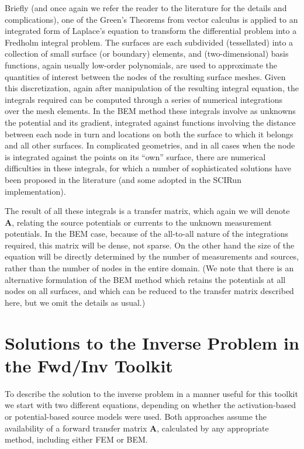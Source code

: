 Briefly (and once again we refer the reader to the literature for the
details and complications), one of the Green's Theorems from vector
calculus is applied to an integrated form of Laplace's equation to transform the
differential problem into a Fredholm integral problem.  The surfaces are
each subdivided (tessellated) into a collection of small surface (or
boundary) elements, and (two-dimensional) basis functions, again usually
low-order polynomials, are used to
approximate the quantities of interest between the nodes of the resulting
surface meshes. Given this discretization, again after
manipulation of the resulting integral equation,
the integrals required can
be computed through a series of numerical integrations over the mesh
elements. In the BEM method these integrals involve as unknowns the
potential and its gradient, integrated against functions involving the
distance between each node in turn and locations on both the surface to
which it belongs and all other surfaces. In complicated geometries, and in
all cases when the node is integrated against the points on its ``own''
surface, there are numerical difficulties in these integrals, for which a
number of sophisticated solutions have been proposed in the literature (and
some adopted in the SCIRun implementation). 

The result of all these integrals is a transfer matrix, which again we will
denote $\mathbf{A}$, relating the source potentials or currents to the
unknown measurement potentials. In the BEM case, because of the all-to-all
nature of the integrations required, this matrix will be dense, not
sparse. On the other hand the size of the equation will be directly
determined by the number of measurements and sources, rather than the
number of nodes in the entire domain. (We note that there is an alternative
formulation of the BEM method which retains the potentials at all nodes on
all surfaces, and which can be reduced to the transfer matrix described
here, but we omit the details as usual.)


\section{Solutions to the Inverse Problem in the Fwd/Inv Toolkit}

To describe the solution to the inverse problem in a manner useful for this
toolkit we start with two different equations, depending on whether the
activation-based or potential-based source models were used. Both
approaches assume the availability of a forward transfer matrix
$\mathbf{A}$, calculated by any appropriate method, including either FEM or
BEM. 

